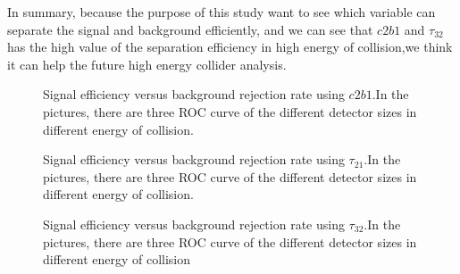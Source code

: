 In summary, because the purpose of this study want to see which variable can separate the signal and background efficiently, and we can see that $c2b1$ and $\tau_{32}$ has the high value of the separation efficiency in high energy of collision,we think it can help the future high energy collider analysis.\\
\label{sec:efficiency}


\begin{figure}
\begin{center}
\end{center}
\caption{Signal efficiency versus background rejection rate using $c2b1$.In the pictures, there are three ROC curve of the different detector sizes in different energy of collision.}
\label{fig:cluster_c2b1}
\end{figure}


\begin{figure}
\begin{center}
\end{center}
\caption{Signal efficiency versus background rejection rate using $\tau_{21}$.In the pictures, there are three ROC curve of the different detector sizes in different energy of collision.}
\label{fig:cluster_tau21}
\end{figure}


\begin{figure}
\begin{center}
\end{center}
\caption{Signal efficiency versus background rejection rate using $\tau_{32}$.In the pictures, there are three ROC curve of the different detector sizes in different energy of collision}
\label{fig:cluster_tau32}
\end{figure}

